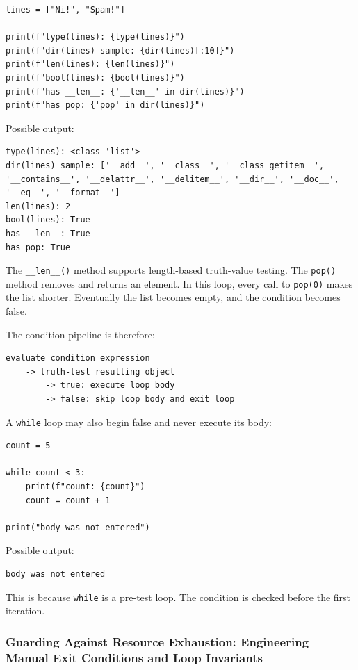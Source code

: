 \begin{verbatim}
lines = ["Ni!", "Spam!"]

print(f"type(lines): {type(lines)}")
print(f"dir(lines) sample: {dir(lines)[:10]}")
print(f"len(lines): {len(lines)}")
print(f"bool(lines): {bool(lines)}")
print(f"has __len__: {'__len__' in dir(lines)}")
print(f"has pop: {'pop' in dir(lines)}")
\end{verbatim}

Possible output:

\begin{verbatim}
type(lines): <class 'list'>
dir(lines) sample: ['__add__', '__class__', '__class_getitem__', '__contains__', '__delattr__', '__delitem__', '__dir__', '__doc__', '__eq__', '__format__']
len(lines): 2
bool(lines): True
has __len__: True
has pop: True
\end{verbatim}

The \texttt{\_\_len\_\_()} method supports length-based truth-value testing. The \texttt{pop()} method removes and returns an element. In this loop, every call to \texttt{pop(0)} makes the list shorter. Eventually the list becomes empty, and the condition becomes false.

The condition pipeline is therefore:

\begin{verbatim}
evaluate condition expression
    -> truth-test resulting object
        -> true: execute loop body
        -> false: skip loop body and exit loop
\end{verbatim}

A \texttt{while} loop may also begin false and never execute its body:

\begin{verbatim}
count = 5

while count < 3:
    print(f"count: {count}")
    count = count + 1

print("body was not entered")
\end{verbatim}

Possible output:

\begin{verbatim}
body was not entered
\end{verbatim}

This is because \texttt{while} is a pre-test loop. The condition is checked before the first iteration.

\subsubsection{Guarding Against Resource Exhaustion: Engineering Manual Exit Conditions and Loop Invariants}

